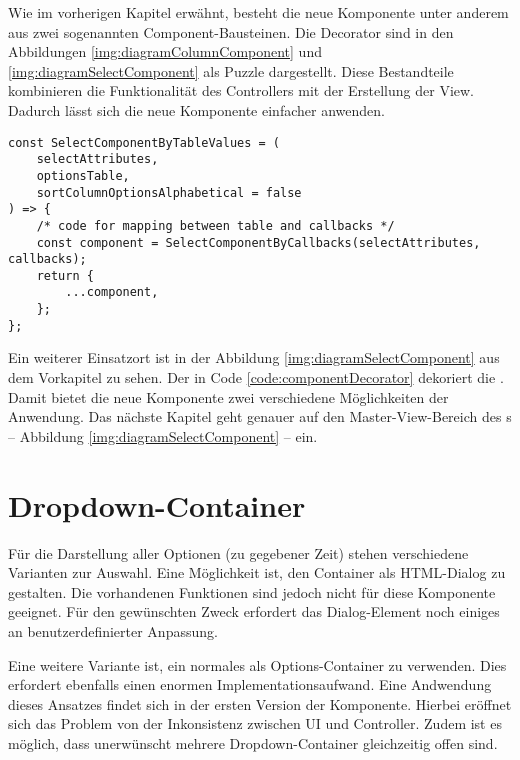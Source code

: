 Wie im vorherigen Kapitel erwähnt, besteht die neue Komponente unter anderem aus zwei sogenannten Component-Bausteinen.
Die Decorator sind in den Abbildungen \ref{img:diagramColumnComponent} und \ref{img:diagramSelectComponent} als Puzzle dargestellt.
Diese Bestandteile kombinieren die Funktionalität des Controllers mit der Erstellung der View.
Dadurch lässt sich die neue Komponente einfacher anwenden.

\begin{lstlisting}[style = htmlcssjs, caption = \codestyle{SelectComponentByTableValue} dekoriert \codestyle{SelectComponentByCallback}, label = code:componentDecorator]
const SelectComponentByTableValues = (
    selectAttributes,
    optionsTable,
    sortColumnOptionsAlphabetical = false
) => {
    /* code for mapping between table and callbacks */
    const component = SelectComponentByCallbacks(selectAttributes, callbacks);
    return {
        ...component,
    };
};
\end{lstlisting}

Ein weiterer Einsatzort ist in der Abbildung \ref{img:diagramSelectComponent} aus dem Vorkapitel zu sehen. 
Der  in Code \ref{code:componentDecorator} dekoriert die .
Damit bietet die neue Komponente zwei verschiedene Möglichkeiten der Anwendung.
Das nächste Kapitel geht genauer auf den Master-View-Bereich des s – Abbildung \ref{img:diagramSelectComponent} – ein. 


\section{Dropdown-Container}
\label{sec:dropdownContainer}

Für die Darstellung aller Optionen (zu gegebener Zeit) stehen verschiedene Varianten zur Auswahl.
Eine Möglichkeit ist, den Container als HTML-Dialog zu gestalten.
Die vorhandenen Funktionen sind jedoch nicht für diese Komponente geeignet.
Für den gewünschten Zweck erfordert das Dialog-Element noch einiges an benutzerdefinierter Anpassung.

Eine weitere Variante ist, ein normales  als Options-Container zu verwenden.
Dies erfordert ebenfalls einen enormen Implementationsaufwand.
Eine Andwendung dieses Ansatzes findet sich in der ersten Version der Komponente.
Hierbei eröffnet sich das Problem von der Inkonsistenz zwischen UI und Controller.
Zudem ist es möglich, dass unerwünscht mehrere Dropdown-Container gleichzeitig offen sind.

